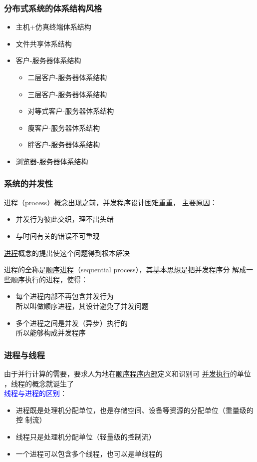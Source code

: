 \documentclass[compress]{beamer}
\begin{document}
\begin{frame}
  \frametitle{分布式系统的体系结构风格}
  \begin{itemize}
    \item 主机+仿真终端体系结构
    \item 文件共享体系结构
    \item 客户-服务器体系结构
      \begin{itemize}
        \item 二层客户-服务器体系结构
        \item 三层客户-服务器体系结构
        \item 对等式客户-服务器体系结构
        \item 瘦客户-服务器体系结构
        \item 胖客户-服务器体系结构
      \end{itemize}
    \item 浏览器-服务器体系结构
  \end{itemize}

\end{frame}

\begin{frame}
  \frametitle{系统的并发性}
   {
    进程（process）概念出现之前，并发程序设计困难重重，
    主要原因：
    \begin{itemize}
      \item 并发行为彼此交织，理不出头绪
      \item 与时间有关的错误不可重现
    \end{itemize}

    \uline{进程}概念的提出使这个问题得到根本解决
  }

   {
    进程的全称是\uline{顺序进程}（sequential process），其基本思想是把并发程序分
    解成一些顺序执行的进程，使得：

    \begin{itemize}
      \item 每个进程内部不再包含并发行为 \\
    \quad 所以叫做顺序进程，其设计避免了并发问题
      \item 多个进程之间是并发（异步）执行的 \\
    \quad 所以能够构成并发程序
    \end{itemize}
  }
\end{frame}

\begin{frame}
  \frametitle{进程与线程}
  由于并行计算的需要，要求人为地在\uline{顺序程序内部}定义和识别可
  \uline{并发执行}的单位
  ，线程的概念就诞生了 \\[2ex]

  \textcolor{blue}{线程与进程的区别}：

  \begin{itemize}
    \item 进程既是处理机分配单位，也是存储空间、设备等资源的分配单位（重量级的控
  制流）

\item 线程只是处理机分配单位（轻量级的控制流） 

\item 一个进程可以包含多个线程，也可以是单线程的
  \end{itemize}
\end{frame}
\end{document}
